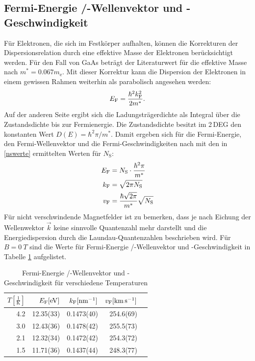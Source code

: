 \documentclass[paper=a4,fontsize=10pt,DIV=18,twocolumn,parskip=half]{scrartcl}
\numberwithin{equation}{section}    %
\begin{document}
\subsection{Fermi-Energie /-Wellenvektor und -Geschwindigkeit}
\label{a5}
Für Elektronen, die sich im Festkörper aufhalten, können die Korrekturen der Dispersionsrelation durch eine effektive Masse der Elektronen berücksichtigt werden. Für den Fall von GaAs beträgt der Literaturwert für die effektive Masse nach \citet{saarland} $m^*=0.067 m_\mathrm{e}$. Mit dieser Korrektur kann die Dispersion der Elektronen in einem gewissen Rahmen weiterhin als parabolisch angesehen werden:
\begin{equation}
E_{\rm F}=\frac{\hbar^2 k_{\rm F}^2}{2 m^*}.
\end{equation}
Auf der anderen Seite ergibt sich die Ladungsträgerdichte als Integral über die Zustandsdichte bis zur Fermienergie. Die Zustandsdichte besitzt im 2\,DEG den konstanten Wert $D(E)=\hbar^2 \pi/m^*$.
Damit ergeben sich für die Fermi-Energie, den Fermi-Wellenvektor und die Fermi-Geschwindigkeiten nach \citet{Anleitung} mit den in \ref{nswerte} ermittelten Werten für $N_\mathrm{S}$:
\begin{align}
E_{\rm F}&=N_\mathrm{S} \cdot \frac{\hbar^2 \pi}{m^*}\\
k_{\rm F}&=\sqrt{2 \pi N_\mathrm{S}}\\
v_{\rm F}&=\frac{\hbar\sqrt{2 \pi}}{m^*} \sqrt{N_\mathrm{S}}
\end{align}
Für nicht verschwindende Magnetfelder ist zu bemerken, dass je nach Eichung der Wellenwektor $\vec{k}$ keine sinnvolle Quantenzahl mehr darstellt und die Energiedispersion durch die Laundau-Quantenzahlen beschrieben wird.
Für $B=\SI{0}{T}$ sind die Werte für Fermi-Energie /-Wellenvektor und -Geschwindigkeit in Tabelle \ref{fermitabelle} aufgelistet.

\begin{table}[htp]
	\begin{center}
		\begin{tabular}{rrrrr}
			\hline
			$T[\frac{1}{\mathrm{K}}]$ & $E_{\rm F}[\mathrm{eV}]$ & $k_{\rm F}[\SI{}{\per\nano\meter}]$ & $v_{\rm F}[\SI{}{\kilo\meter\per\second}]$\\
			\hline
			4.2 &12.35(33)	&0.1473(40)&	254.6(69)\\
			3.0 &12.43(36)	&0.1478(42)&	255.5(73)\\
			2.1 &12.32(34)	&0.1472(42)&	254.3(72)\\
			1.5 &11.71(36)	&0.1437(44)&	248.3(77)\\
			\hline
		\end{tabular}
		\caption{Fermi-Energie /-Wellenvektor und -Geschwindigkeit für verschiedene Temperaturen}
		\label{fermitabelle}
	\end{center}
\end{table}
%
~~~~~~~~~~~~~~~~~~~~~~~~~~~~~~~~~~~~~~~~~~~~~~~~~~~~~~~~~~~~~~~~~~~~~~~~~~~~~
\end{document}
